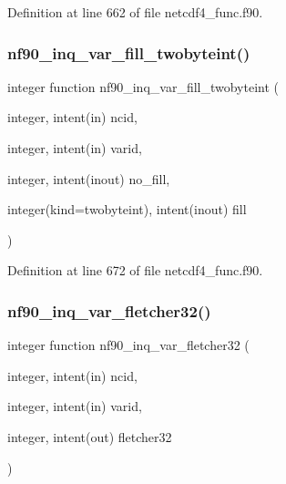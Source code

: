 Definition at line 662 of file netcdf4\+\_\+func.\+f90.

\mbox{\label{netcdf4__func_8f90_ab03aea4c23255011b0987cd78681eae9}} 
\subsubsection{\texorpdfstring{nf90\+\_\+inq\+\_\+var\+\_\+fill\+\_\+twobyteint()}{nf90\_inq\_var\_fill\_twobyteint()}}
{\footnotesize\ttfamily integer function nf90\+\_\+inq\+\_\+var\+\_\+fill\+\_\+twobyteint (\begin{DoxyParamCaption}\item[{integer, intent(in)}]{ncid,  }\item[{integer, intent(in)}]{varid,  }\item[{integer, intent(inout)}]{no\+\_\+fill,  }\item[{integer(kind=twobyteint), intent(inout)}]{fill }\end{DoxyParamCaption})}



Definition at line 672 of file netcdf4\+\_\+func.\+f90.

\mbox{\label{netcdf4__func_8f90_af9fb9c8ab742f8b8e5153b7c8729c364}} 
\subsubsection{\texorpdfstring{nf90\+\_\+inq\+\_\+var\+\_\+fletcher32()}{nf90\_inq\_var\_fletcher32()}}
{\footnotesize\ttfamily integer function nf90\+\_\+inq\+\_\+var\+\_\+fletcher32 (\begin{DoxyParamCaption}\item[{integer, intent(in)}]{ncid,  }\item[{integer, intent(in)}]{varid,  }\item[{integer, intent(out)}]{fletcher32 }\end{DoxyParamCaption})}



